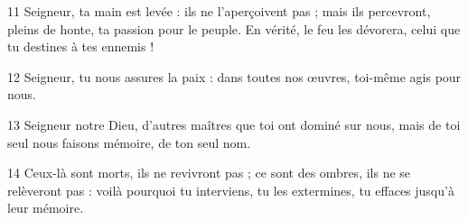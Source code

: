
11 Seigneur, ta main est levée : ils ne l’aperçoivent pas ; mais ils percevront, pleins de honte, ta passion pour le peuple. En vérité, le feu les dévorera, celui que tu destines à tes ennemis !

12 Seigneur, tu nous assures la paix : dans toutes nos œuvres, toi-même agis pour nous.

13 Seigneur notre Dieu, d’autres maîtres que toi ont dominé sur nous, mais de toi seul nous faisons mémoire, de ton seul nom.

14 Ceux-là sont morts, ils ne revivront pas ; ce sont des ombres, ils ne se relèveront pas : voilà pourquoi tu interviens, tu les extermines, tu effaces jusqu’à leur mémoire.